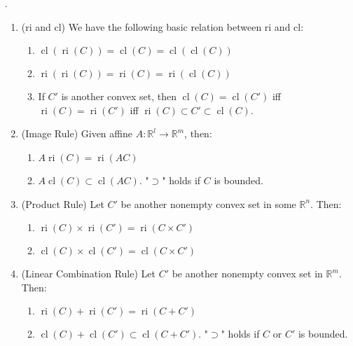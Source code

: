 \begin{prop}\label{prop:012-yoga-ri-cl}.
	\begin{enumerate}[label=(\alph*)]
		\item (ri and cl) We have the following basic relation between ri and cl:
		      \begin{enumerate}[label=(\roman*)]
			      \item $\operatorname{cl}(\operatorname{ri}(C))=\operatorname{cl}(C)=\operatorname{cl}(\operatorname{cl}(C))$
			      \item $\operatorname{ri}(\operatorname{ri}(C))=\operatorname{ri}(C)=\operatorname{ri}(\operatorname{cl}(C))$
			      \item If $C'$ is another convex set, then $\operatorname{cl}(C)=\operatorname{cl}(C')$ iff $\operatorname{ri}(C)=\operatorname{ri}(C')$ iff $\operatorname{ri}(C)\subset C'\subset\operatorname{cl}(C)$.
		      \end{enumerate}
		\item (Image Rule) Given affine $A:\mathbb{R}^l\to \mathbb{R}^m$, then:
		      \begin{enumerate}[label=(\roman*)]
			      \item $A\operatorname{ri}(C)=\operatorname{ri}(AC)$
			      \item $A\operatorname{cl}(C)\subset \operatorname{cl}(AC)$. "$\supset$" holds if $C$ is bounded.
		      \end{enumerate}
		\item (Product Rule) Let $C'$ be another nonempty convex set in some $\mathbb{R}^n$. Then:
		      \begin{enumerate}[label=(\roman*)]
			      \item $\operatorname{ri}(C)\times\operatorname{ri}(C')=\operatorname{ri}(C\times C')$
			      \item $\operatorname{cl}(C)\times\operatorname{cl}(C')=\operatorname{cl}(C\times C')$
		      \end{enumerate}
		\item (Linear Combination Rule) Let $C'$ be another nonempty convex set in $\mathbb{R}^m$. Then:
		      \begin{enumerate}[label=(\roman*)]
			      \item $\operatorname{ri}(C)+\operatorname{ri}(C')=\operatorname{ri}(C+C')$
			      \item $\operatorname{cl}(C)+\operatorname{cl}(C')\subset\operatorname{cl}(C+C')$. "$\supset$" holds if $C$ or $C'$ is bounded.
		      \end{enumerate}

\end{enumerate}
\end{prop}
